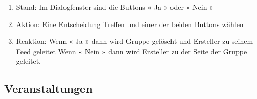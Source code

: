 \documentclass[parskip=full]{scrartcl}
\begin{document}
\begin{itemize}
\begin{enumerate}
				\begin{enumerate}[nosep]
					\item Stand: Im Dialogfenster sind die Buttons « Ja » oder « Nein »
					\item Aktion: Eine Entscheidung Treffen und einer der beiden Buttons wählen
					\item Reaktion: Wenn « Ja » dann wird Gruppe gelöscht und Ersteller zu seinem Feed geleitet
					Wenn  «  Nein » dann wird Ersteller zu der Seite der Gruppe geleitet.
					
				\end{enumerate}
				
			\end{enumerate}		
		
		\end{itemize}


	\subsection{Veranstaltungen}
\end{document}
